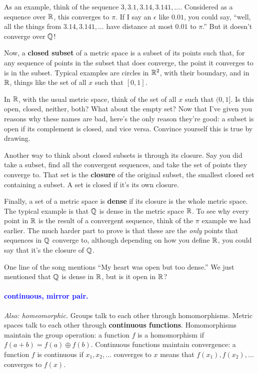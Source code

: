 \documentclass[11pt,paper=letter]{scrartcl}
\renewcommand{\bluebf}[1]{{\bfseries \color{Blue} #1}}
\renewcommand\wp[1]{\paragraph{\textcolor{Blue}{#1.}} \hspace{-1em}}
\newcommand\wl[1]{\label{w:#1}}
\newcommand\oww[1]{\textit{Also: #1.}}
\begin{document}
As an example, think of the sequence $3, 3.1, 3.14, 3.141, \ldots$. Considered as a sequence over $\mathbb R$, this converges to $\pi$. If I say an $\epsilon$ like $0.01$, you could say, ``well, all the things from $3.14, 3.141, \ldots$ have distance at most $0.01$ to $\pi$.'' But it doesn't converge over $\mathbb Q$!

Now, a \textbf{closed subset} of a metric space is a subset of its points such that, for any sequence of points in the subset that does converge, the point it converges to is in the subset. Typical examples are circles in $\mathbb R^2$, with their boundary, and in $\mathbb R$, things like the set of all $x$ such that $[0, 1]$.

\begin{exrboxed}
  In $\mathbb R$, with the usual metric space, think of the set of all $x$ such that $(0, 1]$. Is this open, closed, neither, both? What about the empty set? Now that I've given you reasons why these names are bad, here's the only reason they're good: a subset is open if its complement is closed, and vice versa. Convince yourself this is true by drawing.
\end{exrboxed}

Another way to think about closed subsets is through its closure. Say you did take a subset, find all the convergent sequences, and take the set of points they converge to. That set is the \textbf{closure} of the original subset, the smallest closed set containing a subset. A set is closed if it's its own closure.

Finally, a set of a metric space is \bluebf{dense} if its closure is the whole metric space. The typical example is that $\mathbb Q$ is dense in the metric space $\mathbb R$. To see why every point in $\mathbb R$ is the result of a convergent sequence, think of the $\pi$ example we had earlier. The much harder part to prove is that these are the \textit{only} points that sequences in $\mathbb Q$ converge to, although depending on how you define $\mathbb R$, you could say that it's the closure of $\mathbb Q$.

\begin{exrboxed}
  One line of the song mentions ``My heart was open but too dense.'' We just mentioned that $\mathbb Q$ is dense in $\mathbb R$, but is it open in $\mathbb R$?
\end{exrboxed}

\wp{continuous, mirror pair}
\wl{continuous}
\wl{mirror pair}
\oww{homeomorphic}
Groups talk to each other through homomorphisms. Metric spaces talk to each other through \textbf{continuous functions}. Homomorphisms maintain the group operation: a function $f$ is a homomorphism if $f(a + b) = f(a) \oplus f(b)$. Continuous functions maintain convergence: a function $f$ is continuous if $ x_1 , x_2 ,\ldots $ converges to $ x $ means that $f(x_1), f(x_2), \ldots$ converges to $f(x)$.
\end{document}
